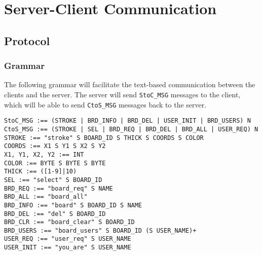 \section{Server-Client Communication}

\subsection{Protocol}

\subsubsection{Grammar}
The following grammar will facilitate the text-based communication between the clients and the server. The server will send \texttt{StoC\_MSG} messages to the client, which will be able to send \texttt{CtoS\_MSG} messages back to the server.

\vspace{5mm}

\setlength{\parindent}{0in}

\texttt{StoC\_MSG :== (STROKE | BRD\_INFO | BRD\_DEL | USER\_INIT | BRD\_USERS) N}\\

\texttt{CtoS\_MSG :== (STROKE | SEL | BRD\_REQ | BRD\_DEL | BRD\_ALL | USER\_REQ) N}\\


\texttt{STROKE :== "stroke" S BOARD\_ID S THICK S COORDS S COLOR}\\
\texttt{COORDS :== X1 S Y1 S X2 S Y2}\\
\texttt{X1, Y1, X2, Y2 :== INT}\\
\texttt{COLOR :== BYTE S BYTE S BYTE}\\
\texttt{THICK :== ([1-9]|10)}\\ %

\texttt{SEL :== "select" S BOARD\_ID}\\

\texttt{BRD\_REQ :== "board\_req" S NAME}\\
\texttt{BRD\_ALL :== "board\_all"}\\
\texttt{BRD\_INFO :== "board" S BOARD\_ID S NAME}\\
\texttt{BRD\_DEL :== "del" S BOARD\_ID}\\
\texttt{BRD\_CLR :== "board\_clear" S BOARD\_ID}\\
\texttt{BRD\_USERS :== "board\_users" S BOARD\_ID (S USER\_NAME)+}\\

\texttt{USER\_REQ :== "user\_req" S USER\_NAME}\\
\texttt{USER\_INIT :== "you\_are" S USER\_NAME}\\

